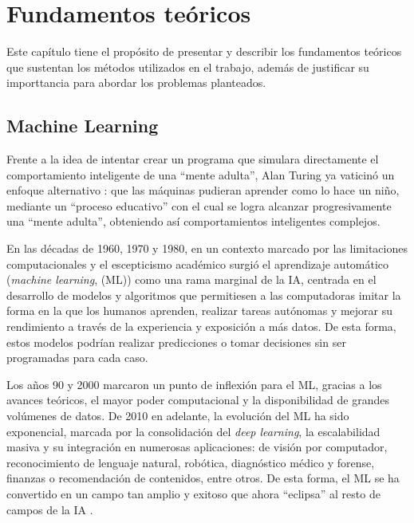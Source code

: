 \chapter{Fundamentos teóricos}

Este capítulo tiene el propósito de presentar y describir los fundamentos teóricos que sustentan los métodos 
utilizados en el trabajo, además de justificar su importtancia para abordar los problemas planteados.


\section{Machine Learning}

Frente a la idea de intentar crear un programa que simulara directamente el comportamiento inteligente de una 
``mente adulta'', Alan Turing ya vaticinó un enfoque alternativo \cite{turing1950}: que las máquinas pudieran 
aprender como lo hace un niño, mediante un ``proceso educativo'' con el cual se logra alcanzar progresivamente 
una ``mente adulta'', obteniendo así comportamientos inteligentes complejos.


En las décadas de 1960, 1970 y 1980, en un contexto marcado por las limitaciones computacionales y el 
escepticismo académico surgió el aprendizaje automático (\textit{machine learning}, (ML)) como 
una rama marginal de la IA, centrada en el desarrollo de modelos y algoritmos que permitiesen a las 
computadoras imitar la forma en la que los humanos aprenden, realizar tareas autónomas y mejorar su 
rendimiento a través de la experiencia y exposición a más datos. De esta forma, estos modelos podrían realizar 
predicciones o tomar decisiones sin ser programadas para cada caso.

Los años 90 y 2000 marcaron un punto de inflexión para el ML, gracias a los avances teóricos, el mayor poder 
computacional y la disponibilidad de grandes volúmenes de datos. De 2010 en adelante, la evolución del ML ha 
sido exponencial, marcada por la consolidación del \textit{deep learning}, la escalabilidad masiva y su 
integración en numerosas aplicaciones: de visión por computador, reconocimiento de lenguaje natural, robótica, 
diagnóstico médico y forense, finanzas o recomendación de contenidos, entre otros. De esta forma, el ML se ha 
convertido en un campo tan amplio y exitoso que ahora ``eclipsa'' al resto de campos de la IA 
\cite{domingos2015}.

